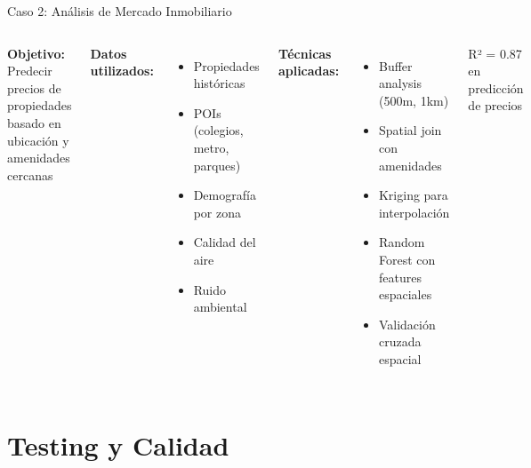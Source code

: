 \documentclass[10pt,aspectratio=169]{beamer}
\newcommand{\conceptbox}[2]{
\begin{tcolorbox}[colframe=usachblue,colback=blue!5,title=#1,fonttitle=\bfseries]
#2
\end{tcolorbox}
}
\begin{document}
\begin{frame}{Caso 2: Análisis de Mercado Inmobiliario}
    \begin{columns}[T]
        \textbf{Objetivo:}
        Predecir precios de propiedades basado en ubicación y amenidades cercanas
        
        \vspace{0.3cm}
        \textbf{Datos utilizados:}
        \begin{itemize}
            \item Propiedades históricas
            \item POIs (colegios, metro, parques)
            \item Demografía por zona
            \item Calidad del aire
            \item Ruido ambiental
        \end{itemize}
        
        \textbf{Técnicas aplicadas:}
        \begin{itemize}
            \item Buffer analysis (500m, 1km)
            \item Spatial join con amenidades
            \item Kriging para interpolación
            \item Random Forest con features espaciales
            \item Validación cruzada espacial
        \end{itemize}
        
        \vspace{0.3cm}
        \conceptbox{Precisión}{
            R² = 0.87 en predicción de precios
        }
    \end{columns}
\end{frame}

\section{Testing y Calidad}
\end{document}
